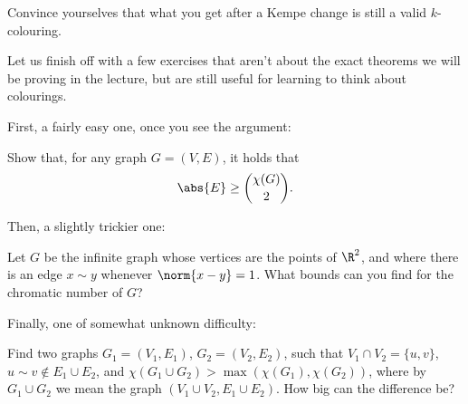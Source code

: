 \documentclass[nobib]{tufte-handout}
\begin{document}
\begin{xca}
  Convince yourselves that what you get after a Kempe change is still a valid $k$-colouring.
\end{xca}

Let us finish off with a few exercises that aren't about the exact theorems we will be proving in the lecture, but are still useful for learning to think about colourings.

First, a fairly easy one, once you see the argument:

\begin{xca}
  Show that, for any graph $G = (V,E)$, it holds that
  $$\abs{E} \geq \binom{\chi(G)}{2}.$$
\end{xca}

Then, a slightly trickier one:

\begin{xca}
  Let $G$ be the infinite graph whose vertices are the points of $\R^2$, and where there is an edge $x \sim y$ whenever $\norm{x - y} = 1$. What bounds can you find for the chromatic number of $G$?
\end{xca}

Finally, one of somewhat unknown difficulty:

\begin{xca}
  Find two graphs $G_1 = (V_1, E_1)$, $G_2 = (V_2, E_2)$, such that $V_1 \cap V_2 = \{u, v\}$, $u \sim v \not\in E_1 \cup E_2$, and $\chi(G_1 \cup G_2) > \max(\chi(G_1), \chi(G_2))$, where by $G_1 \cup G_2$ we mean the graph $(V_1\cup V_2, E_1 \cup E_2)$. How big can the difference be?
\end{xca}

%
%
\end{document}
